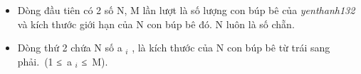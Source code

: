 \begin{itemize}
	\item     Dòng đầu tiên có 2 số N, M lần lượt là số lượng con búp bê của    \emph{     yenthanh132    }    và kích thước giới hạn của N con búp bê đó. N luôn là số chẵn.   
	\item     Dòng thứ 2 chứa N số a    $_     i    $    , là kích thước của N con búp bê từ trái sang phải. (1 ≤ a    $_     i    $    ≤ M).   
\end{itemize}